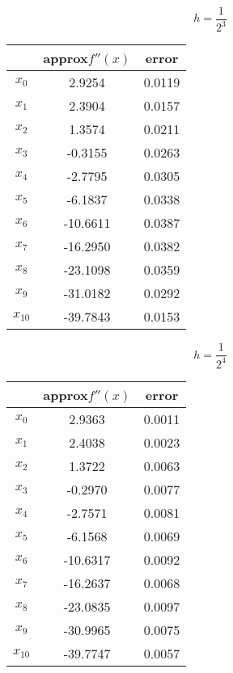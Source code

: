 \documentclass{article}
\begin{document}
$$h=\frac1{2^3}$$
\begin{center}
\begin{tabular}{|c|c|c|}
  \hline
        & approx$f''(x)$ &error\\
  \hline
  $x_0$ & 2.9254 &0.0119\\
  $x_1$ &2.3904  &0.0157\\
  $x_2$ &1.3574  &0.0211\\
  $x_3$ &-0.3155  &0.0263\\
  $x_4$ &-2.7795  &0.0305\\
  $x_5$ &-6.1837  &0.0338\\
  $x_6$ &-10.6611  &0.0387\\
  $x_7$ &-16.2950  &0.0382\\
  $x_8$ &-23.1098  &0.0359\\
  $x_9$ &-31.0182  &0.0292\\
  $x_{10}$ &-39.7843  &0.0153\\
  \hline
\end{tabular}
\end{center}

$$h=\frac1{2^4}$$
\begin{center}
\begin{tabular}{|c|c|c|}
  \hline
        & approx$f''(x)$ &error\\
  \hline
  $x_0$ &2.9363  &0.0011\\
  $x_1$ &2.4038 &0.0023\\
  $x_2$ &1.3722  &0.0063\\
  $x_3$ &-0.2970  &0.0077\\
  $x_4$ &-2.7571  &0.0081\\
  $x_5$ &-6.1568  &0.0069\\
  $x_6$ &-10.6317  &0.0092\\
  $x_7$ &-16.2637  &0.0068\\
  $x_8$ &-23.0835  &0.0097\\
  $x_9$ &-30.9965  &0.0075\\
  $x_{10}$ &-39.7747  &0.0057\\
  \hline
\end{tabular}
\end{center}
\end{document}
